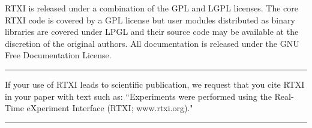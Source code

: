 RTXI is released under a combination of the GPL and LGPL licenses. The core RTXI code is covered by a GPL license but user modules distributed as binary libraries are covered under LPGL and their source code may be available at the discretion of the original authors. All documentation is released under the GNU Free Documentation License.     

\bigskip

\hrule
\bigskip
\attention
If your use of RTXI leads to scientific publication, we request that you cite RTXI in your paper with text such as: ``Experiments were performed using the Real-Time eXperiment Interface (RTXI; www.rtxi.org)."\bigskip
\hrule